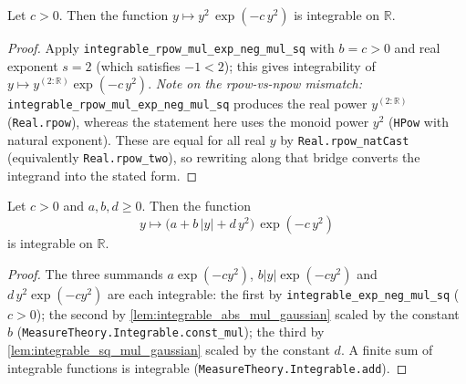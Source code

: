 \begin{lemma}
    \label{lem:integrable_sq_mul_gaussian}
    \leanok
    Let $c > 0$. Then the function $y \mapsto y^2\,\exp(-c\,y^2)$ is integrable
    on $\mathbb{R}$.
\end{lemma}
\begin{proof}
    Apply \texttt{integrable\_rpow\_mul\_exp\_neg\_mul\_sq} with $b = c > 0$ and real
    exponent $s = 2$ (which satisfies $-1 < 2$); this gives integrability of
    $y \mapsto y^{(2:\mathbb{R})}\exp(-c\,y^2)$. \emph{Note on the rpow-vs-npow
    mismatch:} \texttt{integrable\_rpow\_mul\_exp\_neg\_mul\_sq} produces the real
    power $y^{(2:\mathbb{R})}$ (\texttt{Real.rpow}), whereas the statement here uses the
    monoid power $y^2$ (\texttt{HPow} with natural exponent). These are equal for all
    real $y$ by \texttt{Real.rpow\_natCast} (equivalently \texttt{Real.rpow\_two}), so
    rewriting along that bridge converts the integrand into the stated form.
\end{proof}

\begin{lemma}
    \label{lem:gaussian_poly_integrable_zero}
    \leanok
    Let $c > 0$ and $a, b, d \ge 0$. Then the function
    \[ y \mapsto \bigl(a + b\,\lvert y\rvert + d\,y^2\bigr)\,\exp(-c\,y^2) \]
    is integrable on $\mathbb{R}$.
\end{lemma}
\begin{proof}
    The three summands $a\exp(-cy^2)$, $b\lvert y\rvert\exp(-cy^2)$ and
    $d\,y^2\exp(-cy^2)$ are each integrable: the first by
    \texttt{integrable\_exp\_neg\_mul\_sq} ($c>0$); the second by
    \cref{lem:integrable_abs_mul_gaussian} scaled by the constant $b$
    (\texttt{MeasureTheory.Integrable.const\_mul}); the third by
    \cref{lem:integrable_sq_mul_gaussian} scaled by the constant $d$. A finite sum of
    integrable functions is integrable (\texttt{MeasureTheory.Integrable.add}).
\end{proof}

